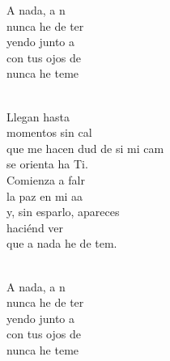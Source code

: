 \begin{cancion}
	\begin{chorus}%
	A nada, a n  \\
	nunca he de ter\\
	yendo junto a \\
	con tus ojos de \\
	nunca he  teme\\
	\end{chorus}%
	\jump\\
	Llegan hasta   \\
	momentos sin cal  \\
	que me hacen dud de si mi cam\\
	se orienta ha Ti.\\
\jump
	Comienza a falr \\
	la paz en mi aa \\
	y, sin esparlo, apareces \\
	haciénd ver\\
	que a nada he de tem.\\\jump\\
	\begin{chorus}%
	A nada, a n  \\
	nunca he de ter\\
	yendo junto a \\
	con tus ojos de \\
	nunca he  teme\\
	\end{chorus}%
	\jump\\
\end{cancion}%
